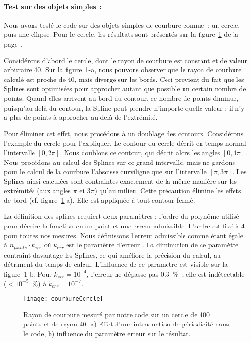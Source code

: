 \paragraph*{Test sur des objets simples~:} Nous avons testé le code sur des objets simples de courbure connue~: un cercle, puis une ellipse. Pour le cercle, les résultats sont présentés sur la figure~\ref{courbureCercle} de la page~\pageref{courbureCercle}.\par 
Considérons d'abord le cercle, dont le rayon de courbure est constant et de valeur arbitraire 40. Sur la figure~\ref{courbureCercle}-a, nous pouvons observer que le rayon de courbure calculé est proche de 40, mais diverge sur les bords. Ceci provient du fait que les Splines sont optimisées pour approcher autant que possible un certain nombre de points. Quand elles arrivent au bord du contour, ce nombre de points diminue, puisqu'au-delà du contour, la Spline peut prendre n'importe quelle valeur : il
n'y a plus de points à approcher au-delà de l'extrémité.\par 
Pour éliminer cet effet, nous procédons à un doublage des contours. Considérons l'exemple du cercle pour l'expliquer. Le contour du cercle décrit en temps normal l'intervalle $[0,2\pi]$. Nous doublons ce contour, qui décrit alors les angles $[0,4\pi]$. Nous procédons au calcul des Splines sur ce grand intervalle, mais ne gardons pour le calcul de la courbure l'abscisse curviligne que sur l'intervalle $[\pi,3\pi]$. Les Splines ainsi calculées sont contraintes exactement de la même manière sur les extrémités (aux angles $\pi$ et $3\pi$) qu'au milieu. Cette précaution élimine les effets de bord (cf. figure~\ref{courbureCercle}-a). Elle est appliquée à tout contour fermé.\par 	
La définition des splines requiert deux paramètres : l'ordre du polynôme utilisé pour décrire la fonction en un point et une erreur admissible. L'ordre est fixé à 4 pour toutes nos mesures. Nous définissons l'erreur admissible comme étant égale à $n_{points} \cdot k_{err}$ où $k_{err}$ est le \og paramètre d'erreur \fg. La diminution de ce paramètre contraint davantage les Splines, ce qui améliore la précision du calcul, au détriment du temps de calcul. L'influence de ce paramètre est visible sur la figure~\ref{courbureCercle}-b. Pour $k_{err} = 10^{-4}$, l'erreur ne dépasse pas 0,3~\%~; elle est indétectable ($< 10^{-5}$~\%) à $k_{err} = 10^{-7}$.\par 
\begin{figure}[!p]
\centering
\texttt{[image: courbureCercle]}
\caption{Rayon de courbure mesuré par notre code sur un cercle de 400 points et de rayon 40. a) Effet d'une introduction de périodicité dans le code, b) influence du paramètre \og erreur \fg{} sur le résultat.}
\label{courbureCercle}
\end{figure}
